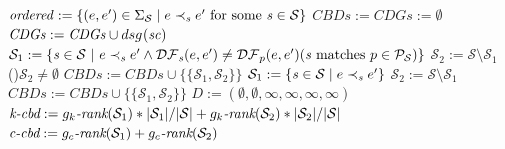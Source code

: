 \begin{function}[!t]
\SetNoFillComment
$\mathit{ordered} := \{(e,e')\in\Sigma_\mathcal{S}\;|\;e\prec_{\mathit{s}}e'\text{ for
    some } \mathit{s}\in \mathcal{S}\}$\;
$CBDs :=  \mathit{CDGs} := \emptyset$\;
  {
$\mathit{CDGs} := \mathit{CDGs} \cup {dsg}_{}(\mathit{sc})$\;
    }
        {
          $\mathcal{S}_1:= \{\mathit{s}\in \mathcal{S}~ |~
          e\prec_{\mathit{s}}e'\wedge\mathcal{DF}_{\mathit{s}}(e,e')\neq \mathcal{DF}_{p}(e,e')
           (\mathit{s}\text{ matches }p\in\mathcal{P}_{\mathcal{S}})\}$\;
          $\mathcal{S}_2:= \mathcal{S}\setminus \mathcal{S}_1$\;
          \If(){$\mathcal{S}_2\neq\emptyset$}
          {
            $\mathit{CBDs}:=\mathit{CBDs}\cup\{\{\mathcal{S}_1,\mathcal{S}_2\}\}$\;
             }
}
                {
                     {
$\mathcal{S}_1:= \{\mathit{s}\in \mathcal{S}\;|\;e\prec_{\mathit{s}}e'\}$\;
                       $\mathcal{S}_2:=
                       \mathcal{S}\setminus\mathcal{S}_1$\;
            $\mathit{CBDs}:=\mathit{CBDs}\cup\{\{\mathcal{S}_1,\mathcal{S}_2\}\}$\;
                       }
                  }
           $D := (\emptyset,\emptyset,\infty,\infty,\infty,\infty)$
                   {
                     $\emph{k-cbd} :=
                     {g_{k}}\emph{-rank}(\mathcal{S}_1)*|\mathcal{S}_1|/|\mathcal{S}|+{g_{k}}\emph{-rank}(\mathcal{S}_2)*|\mathcal{S}_2|/|\mathcal{S}|$\;
                     $\emph{c-cbd} :=
       {g_{c}}\emph{-rank}(\mathcal{S}_1)+ {g_{c}}\emph{-rank}(\mathcal{S}_2)$\;
       }
\end{function}
